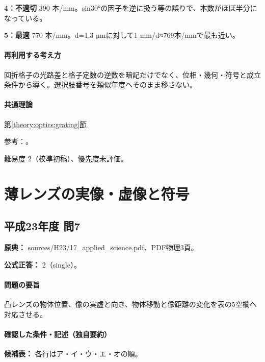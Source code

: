 \noindent\textbf{4：不適切} 390 本/mm。sin30°の因子を逆に扱う等の誤りで、本数がほぼ半分になっている。\par

\noindent\textbf{5：最適} 770 本/mm。d=\allowbreak{}1.3 µmに対して1 mm/d≈769本/mmで最も近い。\par

\paragraph{再利用する考え方} 回折格子の光路差と格子定数の逆数を暗記だけでなく、位相・幾何・符号と成立条件から導く。選択肢番号を類似年度へそのまま移さない。

\paragraph{共通理論} \hyperref[theory:optics:grating]{第\ref*{theory:optics:grating}節}

\par 参考：\cite{os_grating}。

\par 難易度 2（校準初稿）、優先度未評価。

\section{薄レンズの実像・虚像と符号}

\subsection{平成23年度 問7}
\label{q:h23-reg-applied-07}

\noindent\textbf{原典：} sources/H23/17\_applied\_science.pdf、PDF物理3頁。

\textbf{公式正答：} 2（single）。

\paragraph{問題の要旨} 凸レンズの物体位置、像の実虚と向き、物体移動と像距離の変化を表の5空欄へ対応させる。

\paragraph{確認した条件・記述（独自要約）}\mbox{}\par

\noindent\textbf{候補表：} 各行はア・イ・ウ・エ・オの順。\par

